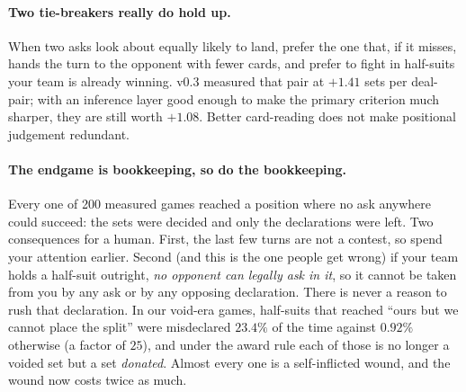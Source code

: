 \documentclass[11pt,letterpaper]{article}
\begin{document}
\paragraph{Two tie-breakers really do hold up.} When two asks look about equally
likely to land, prefer the one that, if it misses, hands the turn to the
opponent with fewer cards, and prefer to fight in half-suits your team is
already winning. v0.3 measured that pair at $+1.41$ sets per deal-pair; with an
inference layer good enough to make the primary criterion much sharper, they are
still worth $+1.08$. Better card-reading does not make positional judgement
redundant.

\paragraph{The endgame is bookkeeping, so do the bookkeeping.} Every one of 200
measured games reached a position where no ask anywhere could succeed: the sets
were decided and only the declarations were left. Two consequences for a human.
First, the last few turns are not a contest, so spend your attention earlier.
Second (and this is the one people get wrong) if your team holds a half-suit
outright, \emph{no opponent can legally ask in it}, so it cannot be taken from
you by any ask or by any opposing declaration. There is never a reason to
rush that declaration. In our void-era games, half-suits that reached ``ours
but we cannot place the split'' were misdeclared $23.4\%$ of the time
against $0.92\%$ otherwise (a factor of $25$), and under the award rule
each of those is no longer a voided set but a set \emph{donated}. Almost
every one is a self-inflicted wound, and the wound now costs twice as much.
\end{document}
